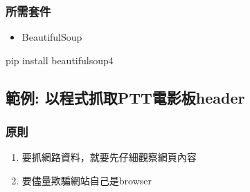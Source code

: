 \documentclass[a4paper,12pt]{article}
\begin{document}
\subsubsection{所需套件}
\label{sec:org536b198}
\begin{itemize}
\item BeautifulSoup\\
\end{itemize}
pip install beautifulsoup4\\
\subsection{範例: 以程式抓取PTT電影板header}
\label{sec:org91a8952}
\subsubsection{原則}
\label{sec:orgf5955de}
\begin{enumerate}
\item 要抓網路資料，就要先仔細觀察網頁內容\\
\item 要儘量欺騙網站自己是browser\\
\end{enumerate}
\end{document}
